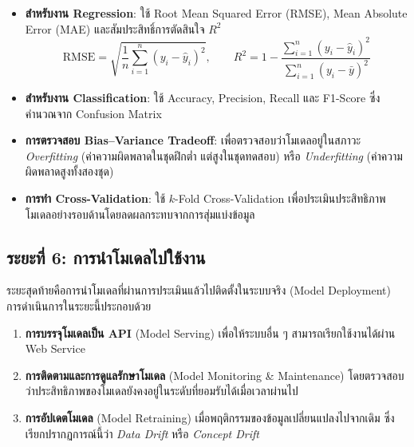 \begin{itemize}
    \item \textbf{สำหรับงาน Regression}: ใช้ Root Mean Squared Error (RMSE), Mean Absolute Error (MAE) และสัมประสิทธิ์การตัดสินใจ $R^2$
    \[
        \text{RMSE} = \sqrt{\frac{1}{n}\sum_{i=1}^{n}(y_i - \hat{y}_i)^2}, \qquad
        R^2 = 1 - \frac{\sum_{i=1}^{n}(y_i - \hat{y}_i)^2}{\sum_{i=1}^{n}(y_i - \bar{y})^2}
    \]

    \item \textbf{สำหรับงาน Classification}: ใช้ Accuracy, Precision, Recall และ F1-Score ซึ่งคำนวณจาก Confusion Matrix

    \item \textbf{การตรวจสอบ Bias--Variance Tradeoff}: เพื่อตรวจสอบว่าโมเดลอยู่ในสภาวะ \textit{Overfitting} (ค่าความผิดพลาดในชุดฝึกต่ำ แต่สูงในชุดทดสอบ) หรือ \textit{Underfitting} (ค่าความผิดพลาดสูงทั้งสองชุด)

    \item \textbf{การทำ Cross-Validation}: ใช้ $k$-Fold Cross-Validation เพื่อประเมินประสิทธิภาพโมเดลอย่างรอบด้านโดยลดผลกระทบจากการสุ่มแบ่งข้อมูล
\end{itemize}

\subsection{ระยะที่ 6: การนำโมเดลไปใช้งาน}
ระยะสุดท้ายคือการนำโมเดลที่ผ่านการประเมินแล้วไปติดตั้งในระบบจริง (Model Deployment) การดำเนินการในระยะนี้ประกอบด้วย

\begin{enumerate}
    \item \textbf{การบรรจุโมเดลเป็น API} (Model Serving) เพื่อให้ระบบอื่น ๆ สามารถเรียกใช้งานได้ผ่าน Web Service
    \item \textbf{การติดตามและการดูแลรักษาโมเดล} (Model Monitoring \& Maintenance) โดยตรวจสอบว่าประสิทธิภาพของโมเดลยังคงอยู่ในระดับที่ยอมรับได้เมื่อเวลาผ่านไป
    \item \textbf{การอัปเดตโมเดล} (Model Retraining) เมื่อพฤติกรรมของข้อมูลเปลี่ยนแปลงไปจากเดิม ซึ่งเรียกปรากฏการณ์นี้ว่า \textit{Data Drift} หรือ \textit{Concept Drift}
\end{enumerate}

